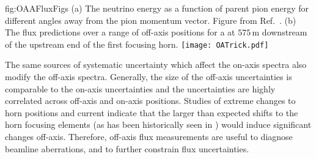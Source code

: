 \begin{dunefigure}{fig:OAAFluxFigs}
{(a) The neutrino energy as a function of parent pion energy for different angles away from the pion momentum vector. Figure from Ref.~\cite{Duffy:2016owt}. (b) The   flux predictions over a range of off-axis positions for a  at $575\,\textrm{m}$ downstream of the upstream end of the first focusing horn. }
    \texttt{[image: OATrick.pdf]}
\end{dunefigure}

The same sources of systematic uncertainty which affect the on-axis spectra also modify the off-axis spectra.  Generally, the size of the off-axis uncertainties is comparable to the on-axis uncertainties and the uncertainties are highly correlated across off-axis and on-axis positions. Studies of extreme changes to horn positions and current indicate that the larger than expected shifts to the horn focusing elements (as has been historically seen in ) would induce significant changes off-axis. Therefore, off-axis flux measurements are useful to diagnose beamline aberrations, and to further constrain flux uncertainties.

